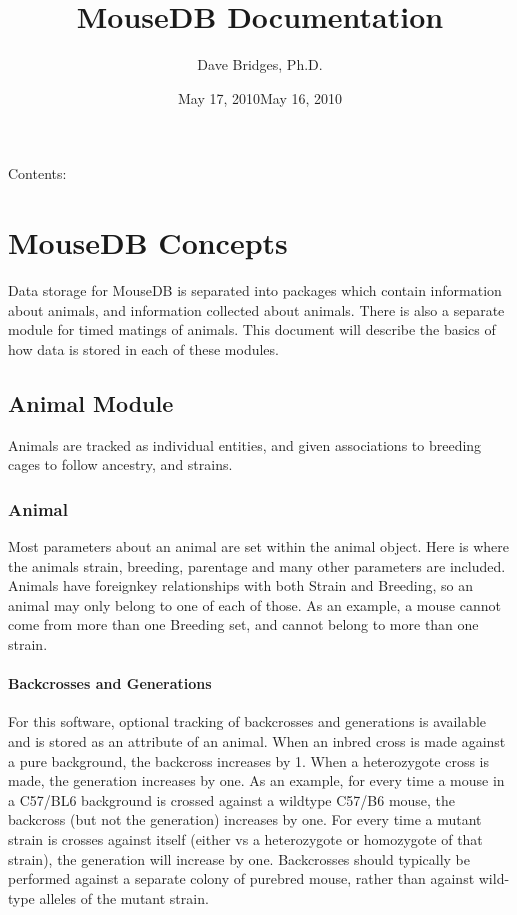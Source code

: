 \documentclass[letterpaper,10pt,english]{sphinxmanual}
\title{MouseDB Documentation}
\date{May 17, 2010}
\date{May 16, 2010}
\author{Dave Bridges, Ph.D.}
\begin{document}
\maketitle
\tableofcontents
\hypertarget{--doc-index}{}


Contents:

\resetcurrentobjects
\hypertarget{--doc-concepts}{}

\chapter{MouseDB Concepts}

Data storage for MouseDB is separated into packages which contain information about animals, and information collected about animals.  There is also a separate module for timed matings of animals.  This document will describe the basics of how data is stored in each of these modules.


\section{Animal Module}

Animals are tracked as individual entities, and given associations to breeding cages to follow ancestry, and strains.


\subsection{Animal}

Most parameters about an animal are set within the animal object.  Here is where the animals strain, breeding, parentage and many other parameters are included.  Animals have foreignkey relationships with both Strain and Breeding, so an animal may only belong to one of each of those.  As an example, a mouse cannot come from more than one Breeding set, and cannot belong to more than one strain.


\subsubsection{Backcrosses and Generations}

For this software, optional tracking of backcrosses and generations is available and is stored as an attribute of an animal.  When an inbred cross is made against a pure background, the backcross increases by 1.  When a heterozygote cross is made, the generation increases by one.  As an example, for every time a mouse in a C57/BL6 background is crossed against a wildtype C57/B6 mouse, the backcross (but not the generation) increases by one.  For every time a mutant strain is crosses against itself (either vs a heterozygote or homozygote of that strain), the generation will increase by one.  Backcrosses should typically be performed against a separate colony of purebred mouse, rather than against wild-type alleles of the mutant strain.
\end{document}
